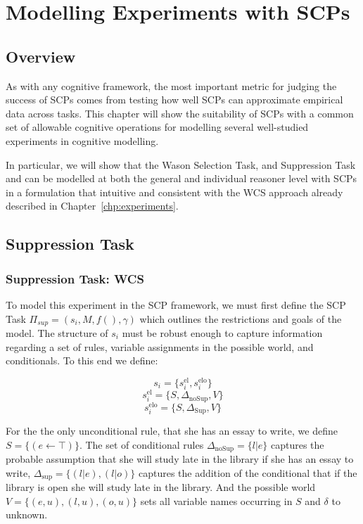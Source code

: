 \chapter{Modelling Experiments with SCPs} \label{chp:model}
\section{Overview}
As with any cognitive framework, the most important metric for judging the success of SCPs comes from testing how well SCPs can approximate empirical data across tasks. This chapter will show the suitability of SCPs with a common set of allowable cognitive operations for modelling several well-studied experiments in cognitive modelling.

In particular, we will show that the Wason Selection Task, and Suppression Task and can be modelled at both the general and individual reasoner level with SCPs in a formulation that intuitive and consistent with the WCS approach already described in Chapter~\ref{chp:experiments}.
\section{Suppression Task} \label{sec:supSCP}

\subsection{Suppression Task: WCS}


To model this experiment in the SCP framework, we must first define the SCP Task $\Pi_{sup}=(s_i,M,f(),\gamma)$ which outlines the restrictions and goals of the model. The structure of $s_i$ must be robust enough to capture information regarding a set of rules, variable assignments in the possible world, and conditionals. To this end we define:

\[s_i=\{s_i^\text{el},s_i^\text{elo}\}\]
\[s_i^\text{el}=\{S,\Delta_\text{noSup}, V\} \]
\[s_i^\text{elo}=\{S,\Delta_\text{Sup}, V\} \]




For the the only unconditional rule, that she has an essay to write, we define $S=\{(e \leftarrow \top)\}$. The set of conditional rules $\Delta_{\text{noSup}}=\{l|e\}$ captures the probable assumption that she will study late in the library if she has an essay to write, $\Delta_{\text{sup}}=\{(l|e),(l|o)\}$ captures the addition of the conditional that if the library is open she will study late in the library. And the possible world $V=\{(e,u),(l,u),(o,u)\}$ sets all variable names occurring in $S$ and $\delta$ to unknown.

